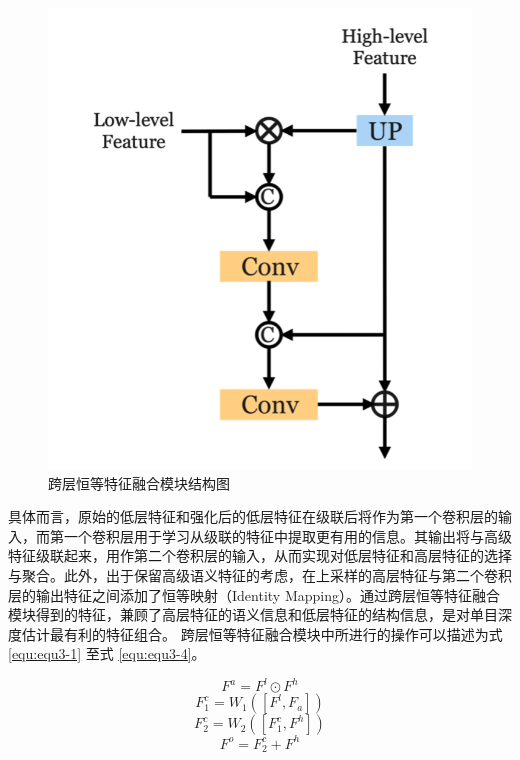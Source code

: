 \begin{figure}[!htbp]
	\centering
	\includegraphics{figures/18.png}
	\caption{跨层恒等特征融合模块结构图}
	\label{fig:fig3-2}
	\vspace{-0.8cm}  %
\end{figure}

具体而言，原始的低层特征和强化后的低层特征在级联后将作为第一个卷积层的输入，而第一个卷积层用于学习从级联的特征中提取更有用的信息。其输出将与高级特征级联起来，用作第二个卷积层的输入，从而实现对低层特征和高层特征的选择与聚合。此外，出于保留高级语义特征的考虑，在上采样的高层特征与第二个卷积层的输出特征之间添加了恒等映射（Identity Mapping）。通过跨层恒等特征融合模块得到的特征，兼顾了高层特征的语义信息和低层特征的结构信息，是对单目深度估计最有利的特征组合。
跨层恒等特征融合模块中所进行的操作可以描述为式 \ref{equ:equ3-1} 至式 \ref{equ:equ3-4}。

\begin{equation}
	F^a=F^l\odot F^h
	\label{equ:equ3-1}
\end{equation}
\vspace{-0.8cm}
\begin{equation}
	F_1^c=W_1\left(\left[F^l,F_a\right]\right)
	\label{equ:equ3-2}
\end{equation}
\vspace{-0.8cm}
\begin{equation}
	F_2^c=W_2\left(\left[F_1^c,F^h\right]\right)
	\label{equ:equ3-3}
\end{equation}
\vspace{-0.8cm}
\begin{equation}
	F^o=F_2^c+F^h
	\label{equ:equ3-4}
\end{equation}


